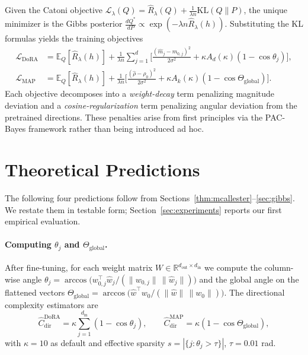 \documentclass[11pt]{article}
\newcommand{\KL}{\mathrm{KL}}
\newcommand{\Thetaglob}{\Theta_{\mathrm{global}}}
\newcommand{\E}{\mathbb{E}}
\newcommand{\R}{\mathbb{R}}
\begin{document}
Given the Catoni objective $\mathcal{L}_\lambda(Q)=\hat R_\lambda(Q)
+\frac1{\lambda n}\KL(Q\|P)$, the unique minimizer is the Gibbs posterior
$\frac{dQ^*}{dP}\propto\exp(-\lambda n\hat R_\lambda(h))$. Substituting the KL
formulas yields the training objectives
\begin{align}
\mathcal{L}_{\mathrm{DoRA}} &= \E_Q[\hat R_\lambda(h)]
+\frac1{\lambda n}\sum_{j=1}^d\Big[\tfrac{(\hat m_j-m_{0,j})^2}{2\sigma^2}
+\kappa A_d(\kappa)(1-\cos\theta_j)\Big],\\
\mathcal{L}_{\mathrm{MAP}} &= \E_Q[\hat R_\lambda(h)]
+\frac1{\lambda n}\Big[\tfrac{(\hat\rho-\rho_0)^2}{2\sigma^2}
+\kappa A_k(\kappa)(1-\cos\Thetaglob)\Big].
\end{align}
Each objective decomposes into a \emph{weight-decay} term penalizing magnitude
deviation and a \emph{cosine-regularization} term penalizing angular deviation from
the pretrained directions. These penalties arise from first principles via the
PAC-Bayes framework rather than being introduced ad hoc.

\section{Theoretical Predictions}\label{sec:predictions}

The following four predictions follow from Sections~\ref{thm:mcallester}--\ref{sec:gibbs}.
We restate them in testable form; Section~\ref{sec:experiments} reports our first
empirical evaluation.

\paragraph{Computing $\theta_j$ and $\Thetaglob$.}
After fine-tuning, for each weight matrix $W\in\R^{d_{\mathrm{out}}\times d_{\mathrm{in}}}$
we compute the column-wise angle
$\theta_j=\arccos\!\big(w_{0,j}^\top\hat w_j/(\|w_{0,j}\|\,\|\hat w_j\|)\big)$ and the
global angle on the flattened vectors
$\Thetaglob=\arccos\!\big(\hat w^\top w_0/(\|\hat w\|\,\|w_0\|)\big)$. The directional
complexity estimators are
\begin{equation}
\widehat{C}^{\mathrm{DoRA}}_{\mathrm{dir}}=\kappa\sum_{j=1}^{d_{\mathrm{in}}}(1-\cos\theta_j),
\qquad
\widehat{C}^{\mathrm{MAP}}_{\mathrm{dir}}=\kappa(1-\cos\Thetaglob),
\end{equation}
with $\kappa=10$ as default and effective sparsity
$s=|\{j:\theta_j>\tau\}|$, $\tau=0.01$ rad.
\end{document}
